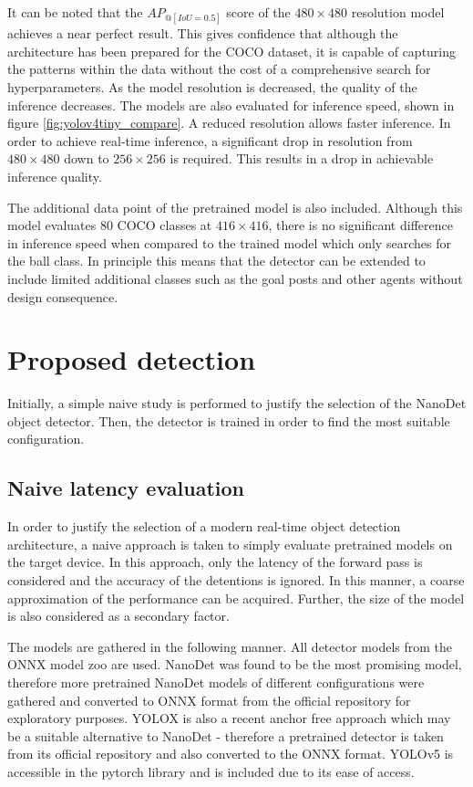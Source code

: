 \documentclass[a4paper,twoside,12pt]{report}
\begin{document}
It can be noted that the $AP_{@[IoU=0.5]}$ score of the $480 \times 480$ resolution model achieves a near perfect result. This gives confidence that although the architecture has been prepared for the COCO dataset, it is capable of capturing the patterns within the data without the cost of a comprehensive search for hyperparameters. As the model resolution is decreased, the quality of the inference decreases. The models are also evaluated for inference speed, shown in figure \ref{fig:yolov4tiny_compare}. A reduced resolution allows faster inference. In order to achieve real-time inference, a significant drop in resolution from $480 \times 480$ down to $256 \times 256$ is required. This results in a drop in achievable inference quality.

The additional data point of the pretrained model is also included. Although this model evaluates 80 COCO classes at $416 \times 416$, there is no significant difference in inference speed when compared to the trained model which only searches for the ball class. In principle this means that the detector can be extended to include limited additional classes such as the goal posts and other agents without design consequence.

\section{Proposed detection}

Initially, a simple naive study is performed to justify the selection of the NanoDet object detector. Then, the detector is trained in order to find the most suitable configuration.

\subsection{Naive latency evaluation}
In order to justify the selection of a modern real-time object detection architecture, a naive approach is taken to simply evaluate pretrained models on the target device. In this approach, only the latency of the forward pass is considered and the accuracy of the detentions is ignored. In this manner, a coarse approximation of the performance can be acquired. Further, the size of the model is also considered as a secondary factor.

The models are gathered in the following manner. All detector models from the ONNX model zoo \cite{modelzoo} are used. NanoDet was found to be the most promising model, therefore more pretrained NanoDet models of different configurations were gathered and converted to ONNX format from the official repository for exploratory purposes. YOLOX \citep{yolox} is also a recent anchor free approach which may be a suitable alternative to NanoDet - therefore a pretrained detector is taken from its official repository \citep{yoloxrepo} and also converted to the ONNX format. YOLOv5 is accessible in the pytorch library and is included due to its ease of access. 
\end{document}
